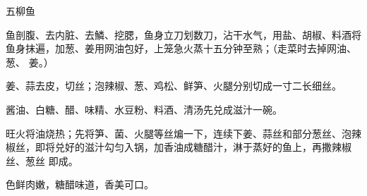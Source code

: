 %
%
%
%
%
%
%
\begin{recipe}{五柳鱼}

\ingredients


\preparation

\step 鱼剖腹、去内脏、去鱗、挖腮，鱼身立刀划数刀，沾干水气，用盐、胡椒、料酒将
鱼身抹遍，加葱、姜用网油包好，上笼急火蒸十五分钟至熟；（走菜时去掉网油、葱、
姜。）

\step 姜、蒜去皮，切丝；泡辣椒、葱、鸡松、鲜笋、火腿分别切成一寸二长细丝。

\step 酱油、白糖、醋、味精、水豆粉、料酒、清汤先兑成滋汁一碗。

\step 旺火将油烧热；先将笋、菌、火腿等丝煸一下，连续下姜、蒜丝和部分葱丝、泡辣
椒丝，即将兑好的滋汁勾匀入锅，加香油成糖醋汁，淋于蒸好的鱼上，再撒辣椒丝、葱丝
即成。

\features

色鲜肉嫩，糖醋味道，香美可口。

\end{recipe}

